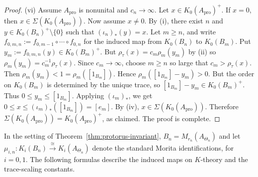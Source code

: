 \documentclass[11pt]{amsart}
\theoremstyle{definition}
\theoremstyle{remark}
\newcommand{\ex}{\mathrm{pro}}
\begin{document}
\begin{proof}
\smallskip

\noindent
\textup{(vi)}
Assume $A_{\ex}$ is nonunital and $c_n\to\infty$. Let
$x\in K_0(A_{\ex})^+.$
If $x=0$, then $x\in\Sigma(K_0(A_{\ex}))$.
Now assume $x\neq0$. By \textup{(i)}, there exist $n$ and $y\in K_0(B_n)^+\setminus\{0\}$ such
that $(\iota_n)_*(y)=x.$
Let $m\geq n$, and write
$f_{0,m,n}:=f_{0,m-1}\circ\cdots\circ f_{0,n}$
for the induced map from \(K_0(B_n)\) to \(K_0(B_m)\). Put
$y_m:=f_{0,m,n}(y)\in K_0(B_m)^+.$ But 
$\rho_\tau(x)=c_m\rho_m(y_m)$ by \textup{(ii)}
so $\rho_m(y_m)=c_m^{-1}\rho_\tau(x).$
Since $c_m\to\infty$, choose $m\geq n$ so large that
$c_m>\rho_\tau(x).$
Then $\rho_m(y_m)<1=\rho_m([1_{B_m}]).$
Hence $\rho_m([1_{B_m}]-y_m)>0.$ But
the order on \(K_0(B_m)\) is determined by the unique trace, so
$[1_{B_m}]-y_m\in K_0(B_m)^+.$
Thus $0\leq y_m\leq [1_{B_m}].$
Applying $(\iota_m)_*$, we get
$0\leq x\leq (\iota_m)_*([1_{B_m}])=[e_m].$
By \textup{(iv)}, $x\in\Sigma(K_0(A_{\ex})).$
Therefore $\Sigma(K_0(A_{\ex}))=K_0(A_{\ex})^+$, as claimed. The proof is complete.
\end{proof}

In the setting of Theorem~\ref{thm:protorus-invariant}, %
$B_n=M_{r_n}(A_{\Theta_n})$
and 
let $\mu_{i,n}\colon K_i(B_n)\xrightarrow{\cong}K_i(A_{\Theta_n})$
denote the standard Morita identifications, for $i=0,1$. 
The following formulas describe the
induced maps on $K$-theory and the trace-scaling constants. 
\end{document}
